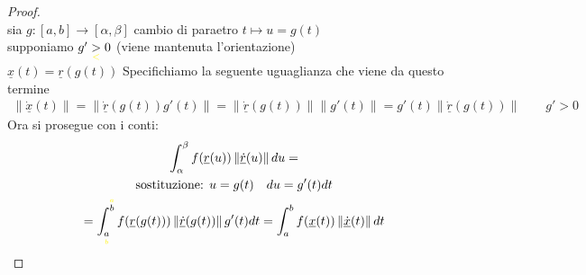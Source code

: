 \documentclass[a4paper, oneside]{article}
\begin{document}
\begin{proof}
    \hfil\\
    sia $g:[a,b] \to [\alpha,\beta]$ cambio di paraetro $t \mapsto u=g(t)$\\
    supponiamo $g'\underset{\textcolor{yellow}{<}}{>}0$ (viene mantenuta l'orientazione)\\
    $\underline{x}(t) = \underline{r}(g(t))$
    Specifichiamo la seguente uguaglianza che viene da questo termine
    \begin{gather*}
        \left\lVert \underline{\dot{x}}(t)\right\rVert = \left\lVert \underline{\dot{r}}(g(t)) g'(t) \right\rVert = \left\lVert \underline{\dot{r}}(g(t)) \right\rVert \left\lVert g'(t) \right\rVert = g'(t) \left\lVert \underline{\dot{r}}(g(t)) \right\rVert \qquad g'>0    
    \end{gather*}
    Ora si prosegue con i conti:
    \begin{gather*}
        \int_{\alpha}^{\beta} f(\underline{r}(u)) \left\lVert \underline{\dot{r}}(u) \right\rVert du = \\
        \text{sostituzione: } u=g(t) \quad du = g'(t) dt\\
        = \int_{\underset{\textcolor{yellow}{b}}{a}}^{\overset{\textcolor{yellow}{a}}{b}} f(\underline{r}(g(t))) \left\lVert \underline{\dot{r}}(g(t)) \right\rVert g'(t) dt = \int_{a}^{b} f(\underline{x}(t)) \left\lVert \underline{\dot{x}}(t) \right\rVert dt  
    \end{gather*}
\end{proof}
\end{document}

